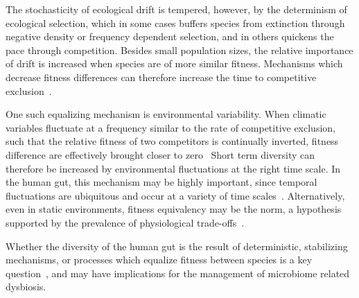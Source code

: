 \documentclass[12pt]{article}
\begin{document}
The stochasticity of ecological drift is tempered, however,
by the determinism of ecological selection,
which in some cases buffers species from extinction through
negative density or frequency dependent selection,
and in others quickens the pace through competition.
Besides small population sizes, the relative importance of
drift is increased when species are of more similar fitness.
Mechanisms which decrease fitness differences can therefore
increase the time to competitive
exclusion~\citep{Chesson2000,Adler2007}.

One such equalizing mechanism is environmental variability.
When climatic variables fluctuate at a frequency similar to the
rate of competitive exclusion, such that the relative fitness of
two competitors is continually inverted,
fitness difference are effectively brought closer to zero~\citep{Hutchinson1961,Chesson1981}
Short term diversity can therefore be increased by
environmental fluctuations at the right time scale.
In the human gut, this mechanism may be highly important,
since temporal fluctuations are ubiquitous and occur at a
variety of time scales~\citep{TODO}.
Alternatively, even in static environments,
fitness equivalency may be the norm,
a hypothesis supported by the prevalence of
physiological trade-offs~\citep{TODO}.

Whether the diversity of the human gut is the result of
deterministic, stabilizing mechanisms, or processes which equalize
fitness between species is a key question~\citep{Adler2007},
and may have implications for the management of microbiome related
dysbiosis.
\end{document}
